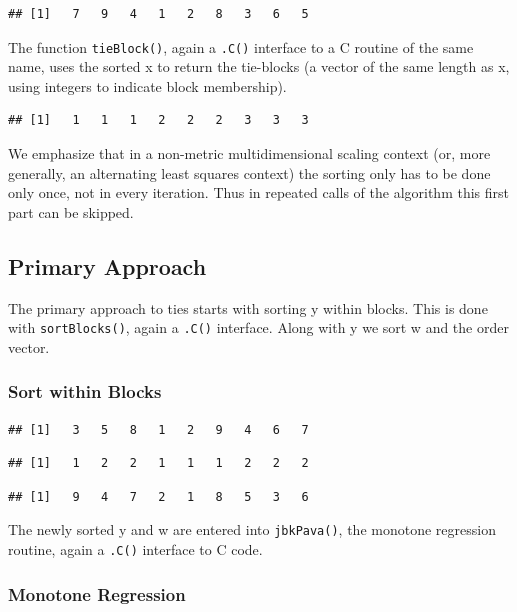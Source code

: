 \documentclass[12pt,]{article}
\begin{document}
\begin{verbatim}
## [1]   7   9   4   1   2   8   3   6   5
\end{verbatim}

The function \texttt{tieBlock()}, again a \texttt{.C()} interface to a C
routine of the same name, uses the sorted x to return the tie-blocks (a
vector of the same length as x, using integers to indicate block
membership).

\begin{verbatim}
## [1]   1   1   1   2   2   2   3   3   3
\end{verbatim}

We emphasize that in a non-metric multidimensional scaling context (or,
more generally, an alternating least squares context) the sorting only
has to be done only once, not in every iteration. Thus in repeated calls
of the algorithm this first part can be skipped.

\subsection{Primary Approach}\label{primary-approach}

The primary approach to ties starts with sorting y within blocks. This
is done with \texttt{sortBlocks()}, again a \texttt{.C()} interface.
Along with y we sort w and the order vector.

\subsubsection{Sort within Blocks}\label{sort-within-blocks}

\begin{verbatim}
## [1]   3   5   8   1   2   9   4   6   7
\end{verbatim}

\begin{verbatim}
## [1]   1   2   2   1   1   1   2   2   2
\end{verbatim}

\begin{verbatim}
## [1]   9   4   7   2   1   8   5   3   6
\end{verbatim}

The newly sorted y and w are entered into \texttt{jbkPava()}, the
monotone regression routine, again a \texttt{.C()} interface to C code.

\subsubsection{Monotone Regression}\label{monotone-regression}
\end{document}
